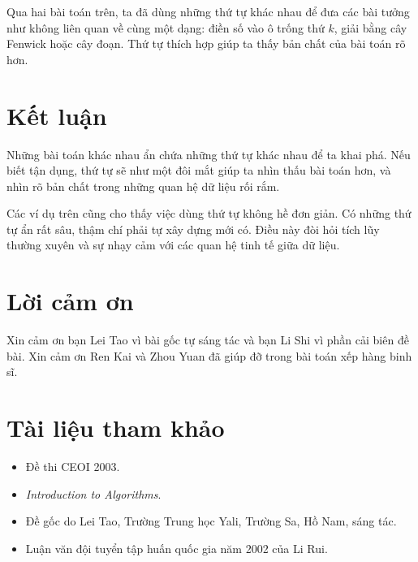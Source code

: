 \documentclass[11pt]{article}
\begin{document}
Qua hai bài toán trên, ta đã dùng những thứ tự khác nhau để đưa các bài tưởng
như không liên quan về cùng một dạng: điền số vào ô trống thứ $k$, giải bằng
cây Fenwick hoặc cây đoạn. Thứ tự thích hợp giúp ta thấy bản chất của bài
toán rõ hơn.

\section{Kết luận}

Những bài toán khác nhau ẩn chứa những thứ tự khác nhau để ta khai phá. Nếu
biết tận dụng, thứ tự sẽ như một đôi mắt giúp ta nhìn thấu bài toán hơn, và
nhìn rõ bản chất trong những quan hệ dữ liệu rối rắm.

Các ví dụ trên cũng cho thấy việc dùng thứ tự không hề đơn giản. Có những thứ
tự ẩn rất sâu, thậm chí phải tự xây dựng mới có. Điều này đòi hỏi tích lũy
thường xuyên và sự nhạy cảm với các quan hệ tinh tế giữa dữ liệu.

\section*{Lời cảm ơn}

Xin cảm ơn bạn Lei Tao vì bài gốc tự sáng tác và bạn Li Shi vì phần cải biên
đề bài. Xin cảm ơn Ren Kai và Zhou Yuan đã giúp đỡ trong bài toán xếp hàng
binh sĩ.

\section*{Tài liệu tham khảo}

\begin{itemize}
  \item Đề thi CEOI 2003.
  \item \textit{Introduction to Algorithms}.
  \item Đề gốc do Lei Tao, Trường Trung học Yali, Trường Sa, Hồ Nam, sáng tác.
  \item Luận văn đội tuyển tập huấn quốc gia năm 2002 của Li Rui.
\end{itemize}
\end{document}

